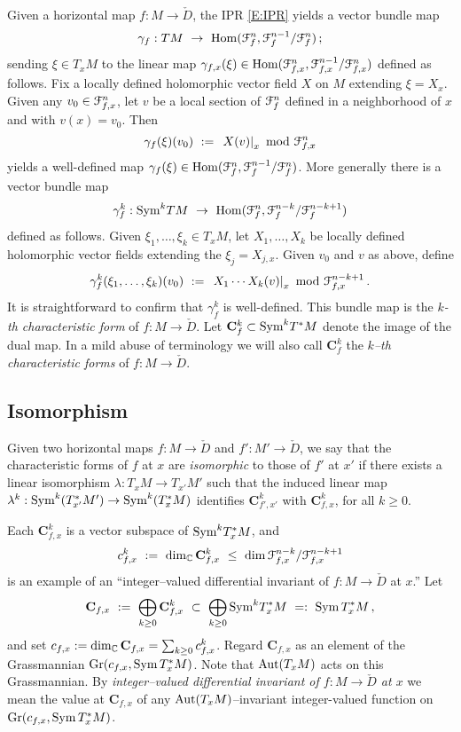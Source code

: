 \documentclass[12pt]{amsart}
\numberwithin{equation}{section}
\numberwithin{table}{section}
\numberwithin{figure}{section}
\begin{document}
Given a horizontal map $f : M \to \check D$, the IPR \eqref{E:IPR} yields a vector bundle map
\[
  \gamma_f : T M \ \to \ \tHom(\cF^n_f,\cF^{n-1}_f/\cF^n_f) \,;
\]
sending $\xi \in T_xM$ to the linear map $\gamma_{f,x}(\xi) \in \mathrm{Hom}(\mathcal F^n_{f,x},\mathcal F^{n-1}_{f,x}/\mathcal F^n_{f,x})$ defined as follows.  Fix a locally defined holomorphic vector field $X$ on $M$ extending $\xi = X_x$.  Given any $v_0 \in \mathcal F^n_{f,x}$, let $v$ be a local section of $\mathcal F^n_f$ defined in a neighborhood of $x$ and with $v(x) = v_0$.  Then 
\[
  \gamma_f(\xi)(v_0) \ := \ \left.X(v)\right|_x \ \hbox{mod} \ \cF^n_{f,x}
\]
yields a well-defined map $\gamma_f(\xi) \in \mathrm{Hom}(\mathcal F^n_f,\mathcal F^{n-1}_f/\mathcal F^n_f)$.
More generally there is a vector bundle map
\[
  \gamma_f^k : \tSym^k T M \ \to \ 
  \tHom(\cF^n_f , \cF^{n-k}_f/\cF^{n-k+1}_f) 
\]
defined as follows.  Given $\xi_1 , \ldots , \xi_k \in T_xM$, let $X_1 , \ldots , X_k$ be locally defined holomorphic vector fields extending the $\xi_j = X_{j,x}$.  Given $v_0$ and $v$ as above, define
\begin{equation}\label{E:gammak}
  \gamma_f^k(\xi_1, \ldots ,\xi_k)(v_0) \ : = \ 
  \left.X_1\cdots X_k(v)\right|_x \ \hbox{mod} \ \cF^{n-k+1}_{f,x} \,.
\end{equation}
It is straightforward to confirm that $\gamma_f^k$ is well-defined.  This bundle map is the \emph{$k$-th characteristic form} of $f:M\to \check D$.  Let $\mathbf{C}^k_f \subset \mathrm{Sym}^k T^* M$ denote the image of the dual map.  In a mild abuse of terminology we will also call $\mathbf{C}^k_f$ the \emph{$k$--th characteristic forms} of $f:M \to \check D$.

\subsection{Isomorphism} \label{S:Cisom}
Given two horizontal maps $f : M \to \check D$ and $f' : M' \to \check D$, we say that the characteristic forms of $f$ at $x$ are \emph{isomorphic} to those of $f'$ at $x'$ if there exists a linear isomorphism $\lambda : T_xM \to T_{x'}M'$ such that the induced linear map $\lambda^k : \mathrm{Sym}^k(T^*_{x'}M') \to \mathrm{Sym}^k (T^*_xM)$ identifies $\mathbf{C}^k_{f',x'}$ with $\mathbf{C}^k_{f,x}$, for all $k \ge 0$.

Each $\mathbf{C}^k_{f,x}$ is a vector subspace of $\mathrm{Sym}^k T^*_xM$, and 
\[
  c_{f,x}^k \ := \ \tdim_\bC\,\mathbf{C}^k_{f,x} 
  \ \le \ \tdim\,\cF^{n-k}_{f,x}/\cF^{n-k+1}_{f,x}
\]
is an example of an ``integer--valued differential invariant of $f: M \to \check D$ at $x$.''  Let
\[
  \mathbf{C}_{f,x} \ := \ 
  \bigoplus_{k\ge0} \mathbf{C}^k_{f,x}\ \subset \ 
  \bigoplus_{k\ge0} \tSym^k T^*_xM \ =: \ 
  \tSym\,T^*_xM \,,
\]
and set $c_{f,x} := \mathrm{dim}_\mathbb C\,\mathbf{C}_{f,x} = \sum_{k\ge0} c^k_{f,x}$.  Regard $\mathbf{C}_{f,x}$ as an element of the Grassmannian $\mathrm{Gr}(c_{f,x},\mathrm{Sym}\,T^*_xM)$.  Note that $\mathrm{Aut}(T_xM)$ acts on this Grassmannian.  By \emph{integer--valued differential invariant of $f:M \to \check D$ at $x$} we mean the value at $\mathbf{C}_{f,x}$ of any $\mathrm{Aut}(T_xM)$--invariant integer-valued function on $\mathrm{Gr}(c_{f,x},\mathrm{Sym}\,T^*_xM)$.
\end{document}
